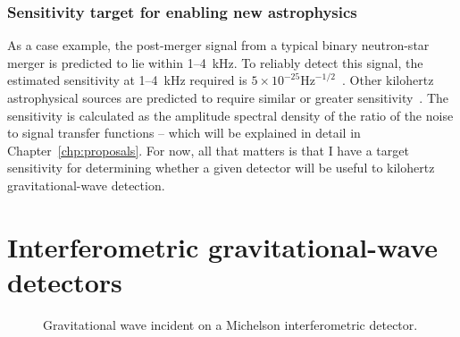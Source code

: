 \subsubsection{Sensitivity target for enabling new astrophysics}

As a case example, the post-merger signal from a typical binary neutron-star merger is predicted to lie within 1--4~kHz. To reliably detect this signal, the estimated sensitivity at 1--4~kHz required is $5\times10^{-25} \mathrm{Hz}^{-1/2}$~\cite{miaoDesignGravitationalWaveDetectors2018}. 
Other kilohertz astrophysical sources are predicted to require similar or greater sensitivity~\cite{}. 
The sensitivity is calculated as the amplitude spectral density of the ratio of the noise to signal transfer functions -- which will be explained in detail in Chapter~\ref{chp:proposals}. For now, all that matters is that I have a target sensitivity for determining whether a given detector will be useful to kilohertz gravitational-wave detection.


\section{Interferometric gravitational-wave detectors}

\begin{figure}
	\centering
	\caption{Gravitational wave incident on a Michelson interferometric detector.}
	\label{fig:GW_incident_Michelson}
\end{figure}

